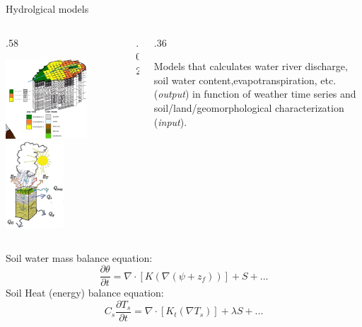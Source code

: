\documentclass[ignorenonframetext,]{beamer}
\def\begincols{\begin{columns}}
\def\begincol{\begin{column}}
\def\endcol{\end{column}}
\def\endcols{\end{columns}}
\begin{document}
\begin{frame}{Hydrolgical models}

\begincols
 \begincol{.58\textwidth}

\includegraphics[width=0.70000\textwidth]{resources/images/geotop_grid_mod.jpg}~
\includegraphics[width=0.50000\textwidth]{resources/images/water_balance.png}\\
\endcol
\begincol{.02\textwidth} \endcol
\begincol{.36\textwidth}

Models that calculates water river discharge, soil water
content,evapotranspiration, etc. (\emph{output}) in function of weather
time series and soil/land/geomorphological characterization
(\emph{input}).

\endcol
\endcols
Soil water mass balance equation:
\[\frac{\partial \theta}{\partial t} =   \nabla  \cdot \left[ K \left(\nabla (\psi+z_f) \right) \right] + S + ...\]
Soil Heat (energy) balance equation:
\[C_s \frac{\partial T_s}{\partial t} =  \nabla  \cdot \left[ K_t  ( \nabla T_s  ) \right] + \lambda S + ...\]

\end{frame}
\end{document}
